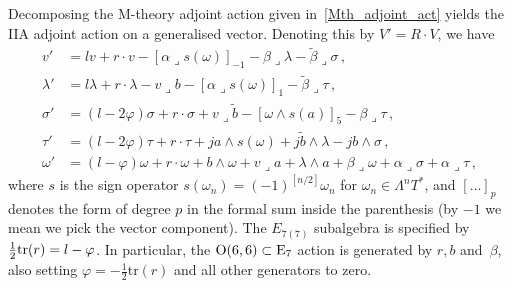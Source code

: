 \documentclass[debug]{phd}
\begin{document}
			Decomposing the M-theory adjoint action given in~\eqref{Mth_adjoint_act} yields the IIA adjoint action on a generalised vector. Denoting this by $V' = R\cdot V$, we have
					\begin{align}\label{IIAadjvecCompact}
						v' &= l v + r \cdot v - [ \alpha \lrcorner s(\omega)]_{-1} - \beta \lrcorner \lambda - \tilde \beta \lrcorner \sigma \, , \\
						\lambda' &= l \lambda + r \cdot \lambda - v \lrcorner b - [\alpha\lrcorner s(\omega)]_1 - \tilde \beta \lrcorner \tau \, , \\
						\sigma' &= (l-2\varphi) \sigma + r \cdot \sigma + v \lrcorner \tilde b - [\omega\wedge s(a)]_5 - \beta \lrcorner \tau \, , \\
						\tau' &= (l-2\varphi) \tau + r \cdot \tau + j a \wedge s(\omega) + j \tilde b \wedge \lambda - j b \wedge \sigma \, , \\
						\omega' &= (l-\varphi) \omega + r \cdot \omega + b\wedge \omega + v \lrcorner a + \lambda \wedge a + \beta \lrcorner \omega + \alpha \lrcorner \sigma +\alpha\lrcorner \tau \, ,
					\end{align}
			where $s$ is the sign operator $s(\omega_n) = (-1)^{[n/2]} \omega_n$ for $\omega_n \in \Lambda^n T^*$, and $[\ldots]_p$ denotes the form of degree $p$ in the formal sum inside the parenthesis (by $-1$ we mean we pick the vector component). 
			The $E_{7(7)}$ subalgebra is specified by $\frac 12{\rm tr}(r) = l - \varphi$. 
			In particular, the $\mathrm{O}(6,6) \subset \mathrm{E}_{7}$ action is generated by $r, b$ and~$\beta$, also setting $\varphi = -\tfrac{1}{2}\mathrm{tr}(r)$ and all other generators to zero. 
\end{document}
